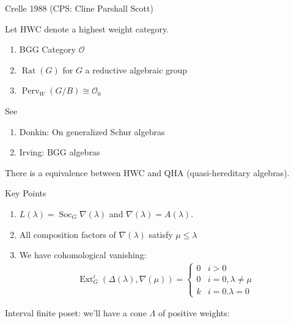 Crelle 1988 (CPS: Cline Parshall Scott)

Let HWC denote a highest weight category.

\begin{example}

\begin{enumerate}
\def\labelenumi{\arabic{enumi}.}
\item
  BGG Category \({\mathcal{O}}\)
\item
  \(\operatorname{Rat}(G)\) for \(G\) a reductive algebraic group
\item
  \(\operatorname{Perv}_W(G/B) \cong {\mathcal{O}}_0\)
\end{enumerate}

\end{example}

See

\begin{enumerate}
\def\labelenumi{\arabic{enumi}.}
\item
  Donkin: On generalized Schur algebras
\item
  Irving: BGG algebras
\end{enumerate}

There is a equivalence between HWC and QHA (quasi-hereditary algebras).

\begin{remark}

Key Points

\begin{enumerate}
\def\labelenumi{\arabic{enumi}.}
\item
  \(L(\lambda) = \operatorname{Soc}_G \nabla(\lambda)\) and
  \(\nabla(\lambda) = A(\lambda)\).
\item
  All composition factors of \(\nabla(\lambda)\) satisfy
  \(\mu \leq \lambda\)
\item
  We have cohomological vanishing:
  \begin{align*}
  \operatorname{Ext}_G^i(\Delta(\lambda), \nabla(\mu)) = 
  \begin{cases}
  0 & i >0 \\
  0 & i=0, \lambda \neq \mu \\
  k & i=0. \lambda = 0
  \end{cases}
  \end{align*}
\end{enumerate}

\end{remark}

Interval finite poset: we'll have a cone \(\Lambda\) of positive
weights:

